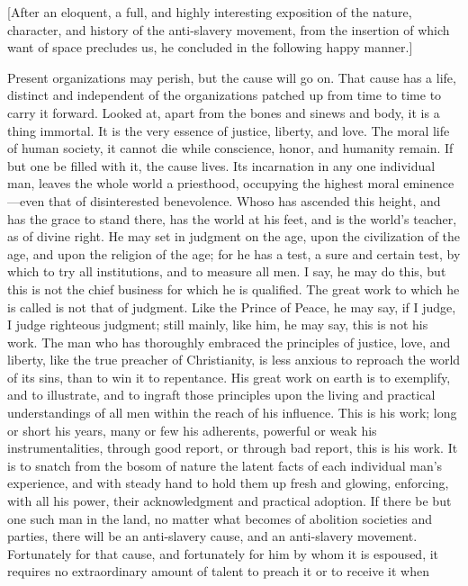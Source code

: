 {{[}After an eloquent, a full, and highly interesting exposition of the
nature, character, and history of the anti-slavery movement, from the
insertion of which want of space precludes us, he concluded in the
following happy manner.{]}}

Present organizations may perish, but the cause will go on. That cause
has a life, distinct and independent of the organizations patched up
from time to time to carry it forward. Looked at, apart from the bones
and sinews and body, it is a thing immortal. It is the very essence of
justice, liberty, and love. The moral life of human society, it cannot
die while conscience, honor, and humanity remain. If but one be filled
with it, the cause lives. Its incarnation in any one individual man,
leaves the whole world a priesthood, occupying the highest moral
eminence---even that of disinterested benevolence. Whoso has ascended
this height, and has the grace to stand there, has the world at his
feet, and is the world's teacher, as of divine right. He may set in
judgment on the age, upon the civilization of the age, and upon the
religion of the age; for he has a test, a sure and certain test, by
which to try all institutions, and to measure all men. I say, he may do
this, but this is not the chief business for which he is qualified. The
great work to which he is called is not that of judgment. Like the
Prince of Peace, he may say, if I judge, I judge righteous judgment;
still mainly, like him, he may say, this is not his work. The man who
has thoroughly embraced the principles of justice, love, and liberty,
like the true preacher of Christianity, is less anxious to reproach the
world of its sins, than to win it to repentance. His {}great work on
earth is to exemplify, and to illustrate, and to ingraft those
principles upon the living and practical understandings of all men
within the reach of his influence. This is his work; long or short his
years, many or few his adherents, powerful or weak his
instrumentalities, through good report, or through bad report, this is
his work. It is to snatch from the bosom of nature the latent facts of
each individual man's experience, and with steady hand to hold them up
fresh and glowing, enforcing, with all his power, their acknowledgment
and practical adoption. If there be but one such man in the land, no
matter what becomes of abolition societies and parties, there will be an
anti-slavery cause, and an anti-slavery movement. Fortunately for that
cause, and fortunately for him by whom it is espoused, it requires no
extraordinary amount of talent to preach it or to receive it when
